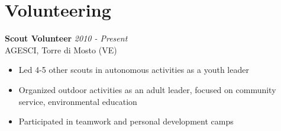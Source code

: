 \documentclass[a4paper,10pt]{article}
\begin{document}
\begin{minipage}[t]{0.58\textwidth}
    \section*{Volunteering}
        \textbf{Scout Volunteer} \hfill \textit{2010 - Present} \\
        AGESCI, Torre di Mosto (VE)
        \vspace{-0.1cm}
        \begin{itemize}[left=0.2cm, label={\textbullet}, itemsep=0cm]
            \item Led 4-5 other scouts in autonomous activities as a youth leader
            \item Organized outdoor activities as an adult leader, focused on community service, environmental education
            \item Participated in teamwork and personal development camps
        \end{itemize}
\end{minipage}

\vfill
\end{document}
